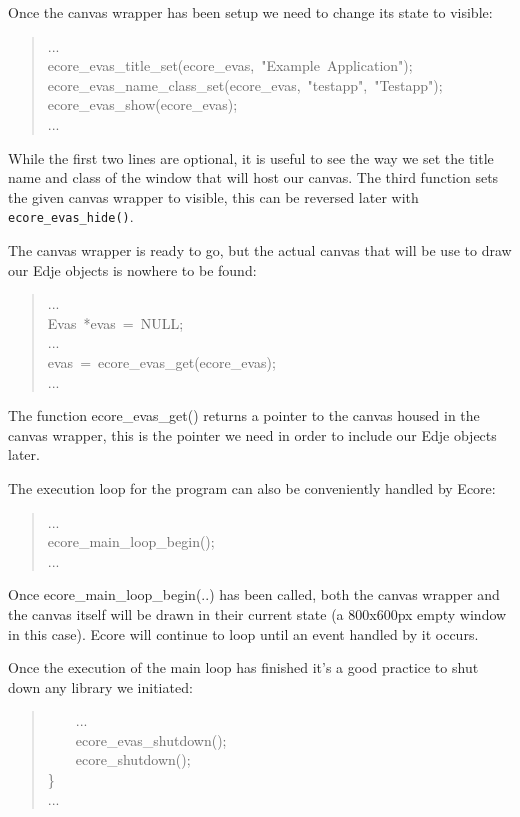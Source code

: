\documentclass[12pt,a4paper,english]{book}
\begin{document}
Once the canvas wrapper has been setup we need to change its state to visible:
\begin{quote}{\ttfamily \raggedright \noindent
...~\\
ecore{\_}evas{\_}title{\_}set(ecore{\_}evas,~"Example~Application");~\\
ecore{\_}evas{\_}name{\_}class{\_}set(ecore{\_}evas,~"testapp",~"Testapp");~\\
ecore{\_}evas{\_}show(ecore{\_}evas);~\\
...
}\end{quote}

While the first two lines are optional, it is useful to see the way we set the
title name and class of the window that will host our canvas. The third
function sets the given canvas wrapper to visible, this can be reversed later
with \texttt{ecore{\_}evas{\_}hide()}.

The canvas wrapper is ready to go, but the actual canvas that will be use to
draw our Edje objects is nowhere to be found:
\begin{quote}{\ttfamily \raggedright \noindent
...~\\
Evas~*evas~=~NULL;~\\
...~\\
evas~=~ecore{\_}evas{\_}get(ecore{\_}evas);~\\
...
}\end{quote}

The function ecore{\_}evas{\_}get() returns a pointer to the canvas housed in the
canvas wrapper, this is the pointer we need in order to include our Edje
objects later.

The execution loop for the program can also be conveniently handled by Ecore:
\begin{quote}{\ttfamily \raggedright \noindent
...~\\
ecore{\_}main{\_}loop{\_}begin();~\\
...
}\end{quote}

Once ecore{\_}main{\_}loop{\_}begin(..) has been called, both the canvas wrapper and
the canvas itself will be drawn in their current state (a 800x600px empty
window in this case). Ecore will continue to loop until an event handled by it
occurs.

Once the execution of the main loop has finished it's a good practice to shut
down any library we initiated:
\begin{quote}{\ttfamily \raggedright \noindent
~~~~...~\\
~~~~ecore{\_}evas{\_}shutdown();~\\
~~~~ecore{\_}shutdown();~\\
{\}}~\\
...
}\end{quote}
\end{document}
